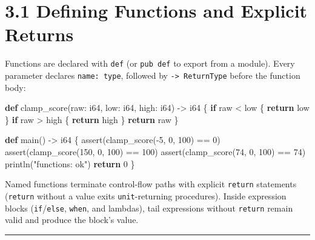 \documentclass[
  english,
  oneside]{book}
\newenvironment{Shaded}{\begin{snugshade}}{\end{snugshade}}
\newcommand{\ControlFlowTok}[1]{\textcolor[rgb]{0.77,0.53,0.75}{\textbf{#1}}}
\newcommand{\DataTypeTok}[1]{\textcolor[rgb]{0.31,0.79,0.69}{#1}}
\newcommand{\DecValTok}[1]{\textcolor[rgb]{0.71,0.81,0.66}{#1}}
\newcommand{\FunctionTok}[1]{\textcolor[rgb]{0.86,0.86,0.67}{#1}}
\newcommand{\KeywordTok}[1]{\textcolor[rgb]{0.34,0.61,0.84}{\textbf{#1}}}
\newcommand{\NormalTok}[1]{\textcolor[rgb]{0.83,0.83,0.83}{#1}}
\newcommand{\OperatorTok}[1]{\textcolor[rgb]{0.83,0.83,0.83}{#1}}
\newcommand{\StringTok}[1]{\textcolor[rgb]{0.81,0.57,0.47}{#1}}
\begin{document}
\section{3.1 Defining Functions and Explicit
Returns}\label{defining-functions-and-explicit-returns}

Functions are declared with \texttt{def} (or \texttt{pub\ def} to export
from a module). Every parameter declares \texttt{name:\ type}, followed
by \texttt{-\textgreater{}\ ReturnType} before the function body:

\begin{Shaded}
\begin{Highlighting}[]
\KeywordTok{def}\NormalTok{ clamp\_score(raw: }\DataTypeTok{i64}\NormalTok{, low: }\DataTypeTok{i64}\NormalTok{, high: }\DataTypeTok{i64}\NormalTok{) }\OperatorTok{{-}\textgreater{}} \DataTypeTok{i64}\NormalTok{ \{}
    \ControlFlowTok{if}\NormalTok{ raw }\OperatorTok{\textless{}}\NormalTok{ low \{}
        \ControlFlowTok{return}\NormalTok{ low}
\NormalTok{    \}}
    \ControlFlowTok{if}\NormalTok{ raw }\OperatorTok{\textgreater{}}\NormalTok{ high \{}
        \ControlFlowTok{return}\NormalTok{ high}
\NormalTok{    \}}
    \ControlFlowTok{return}\NormalTok{ raw}
\NormalTok{\}}

\KeywordTok{def}\NormalTok{ main() }\OperatorTok{{-}\textgreater{}} \DataTypeTok{i64}\NormalTok{ \{}
    \FunctionTok{assert}\NormalTok{(clamp\_score(}\OperatorTok{{-}}\DecValTok{5}\NormalTok{, }\DecValTok{0}\NormalTok{, }\DecValTok{100}\NormalTok{) }\OperatorTok{==} \DecValTok{0}\NormalTok{)}
    \FunctionTok{assert}\NormalTok{(clamp\_score(}\DecValTok{150}\NormalTok{, }\DecValTok{0}\NormalTok{, }\DecValTok{100}\NormalTok{) }\OperatorTok{==} \DecValTok{100}\NormalTok{)}
    \FunctionTok{assert}\NormalTok{(clamp\_score(}\DecValTok{74}\NormalTok{, }\DecValTok{0}\NormalTok{, }\DecValTok{100}\NormalTok{) }\OperatorTok{==} \DecValTok{74}\NormalTok{)}
\NormalTok{    println(}\StringTok{"functions: ok"}\NormalTok{)}
    \ControlFlowTok{return} \DecValTok{0}
\NormalTok{\}}
\end{Highlighting}
\end{Shaded}

Named functions terminate control-flow paths with explicit
\texttt{return} statements (\texttt{return} without a value exits
\texttt{unit}-returning procedures). Inside expression blocks
(\texttt{if}/\texttt{else}, \texttt{when}, and lambdas), tail
expressions without \texttt{return} remain valid and produce the block's
value.

\begin{center}\rule{0.5\linewidth}{0.5pt}\end{center}
\end{document}
